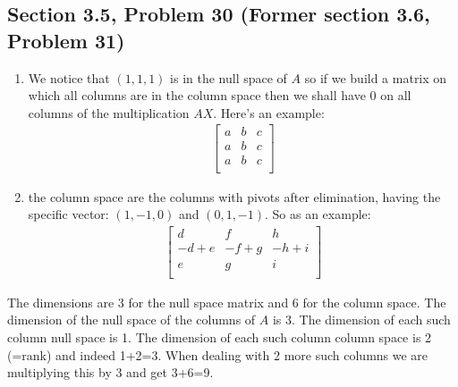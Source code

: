 \documentclass[a4paper,11pt]{article}
\begin{document}
\subsection*{Section 3.5, Problem 30  (Former section 3.6, Problem 31)}
\begin{enumerate}[label=\alph*]
\item We notice that $(1,1,1)$ is in the null space of $A$ so if we build a matrix on which all columns are in the column space then we shall have 0 on all columns of the multiplication $AX$. Here's an example:
\begin{align*}
\begin{bmatrix}
a & b & c\\
a & b & c\\
a & b & c\\
\end{bmatrix}
\end{align*}
\item the column space are the columns with pivots after elimination, having the specific vector: $(1, -1, 0)$ and $(0,1,-1)$. So as an example:
\begin{align*}
\begin{bmatrix}
d    & f    & h\\
-d+e & -f+g & -h+i\\
e    & g    & i\\
\end{bmatrix}
\end{align*}
\end{enumerate}
The dimensions are 3 for the null space matrix and 6 for the column space. The   dimension of the null space of the columns of $A$ is 3. The dimension of each such column null space is 1. The dimension of each such column column space is 2 (=rank) and indeed 1+2=3. When dealing with 2 more such columns we are multiplying this by 3 and get 3+6=9.  
\end{document}
